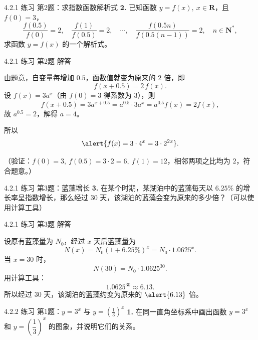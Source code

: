 \documentclass[10pt,aspectratio=169,serif]{ctexbeamer}
\begin{document}
\begin{frame}[t]{4.2.1 练习 第2题：求指数函数解析式}
\textbf{2.} 已知函数 $y=f(x),\ x\in\mathbf{R}$，且 $f(0)=3$，
\[
\frac{f(0.5)}{f(0)}=2,\quad \frac{f(1)}{f(0.5)}=2,\quad\cdots,\quad
\frac{f(0.5n)}{f(0.5(n-1))}=2,\quad n\in\mathbf{N}^{*},
\]
求函数 $y=f(x)$ 的一个解析式。
\end{frame}

\begin{frame}[t]{4.2.1 练习 第2题 解答}
\begin{tcolorbox}[colback=orange!10,colframe=orange,title=\textbf{解}]
由题意，自变量每增加 $0.5$，函数值就变为原来的 $2$ 倍，即
\[
f(x+0.5)=2\,f(x).
\]
设 $f(x)=3a^{x}$（由 $f(0)=3$ 得系数为 $3$），则
\[
f(x+0.5)=3a^{x+0.5}=a^{0.5}\cdot 3a^{x}=a^{0.5}f(x)=2f(x),
\]
故 $a^{0.5}=2$，解得 $a=4$。

\vspace{0.6em}
所以
\[
\alert{f(x)=3\cdot 4^{x}=3\cdot 2^{2x}}.
\]

\vspace{0.4em}
\small（验证：$f(0)=3,\ f(0.5)=3\cdot 2=6,\ f(1)=12$，相邻两项之比均为 $2$，符合题意。）
\end{tcolorbox}
\end{frame}

\begin{frame}[t]{4.2.1 练习 第3题：蓝藻增长}
\textbf{3.} 在某个时期，某湖泊中的蓝藻每天以 $6.25\%$ 的增长率呈指数增长，那么经过 $30$ 天，该湖泊的蓝藻会变为原来的多少倍？（可以使用计算工具）
\end{frame}

\begin{frame}[t]{4.2.1 练习 第3题 解答}
\begin{tcolorbox}[colback=orange!10,colframe=orange,title=\textbf{解}]
设原有蓝藻量为 $N_{0}$，经过 $x$ 天后蓝藻量为
\[
N(x)=N_{0}(1+6.25\%)^{x}=N_{0}\cdot 1.0625^{x}.
\]
当 $x=30$ 时，
\[
N(30)=N_{0}\cdot 1.0625^{30}.
\]
用计算工具：
\[
1.0625^{30}\approx 6.13.
\]
所以经过 $30$ 天，该湖泊的蓝藻约变为原来的 $\alert{6.13}$ 倍。
\end{tcolorbox}
\end{frame}

\begin{frame}[t]{4.2.2 练习 第1题：$y=3^{x}$ 与 $y=\left(\frac{1}{3}\right)^{x}$}
\textbf{1.} 在同一直角坐标系中画出函数 $y=3^{x}$ 和 $y=\left(\dfrac{1}{3}\right)^{x}$ 的图象，并说明它们的关系。
\end{frame}
\end{document}
